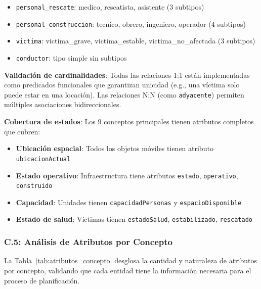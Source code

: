 \documentclass[conference]{IEEEtran}
\begin{document}
    \begin{itemize}[leftmargin=*,itemsep=1pt]
    \item \texttt{personal\_rescate}: medico, rescatista, asistente (3 subtipos)
    \item \texttt{personal\_construccion}: tecnico, obrero, ingeniero, operador (4 subtipos)
    \item \texttt{victima}: victima\_grave, victima\_estable, victima\_no\_afectada (3 subtipos)
    \item \texttt{conductor}: tipo simple sin subtipos
    \end{itemize}

    \textbf{Validación de cardinalidades}: Todas las relaciones 1:1 están implementadas como predicados funcionales que garantizan unicidad (e.g., una víctima solo puede estar en una locación). Las relaciones N:N (como \texttt{adyacente}) permiten múltiples asociaciones bidireccionales.

    \textbf{Cobertura de estados}: Los 9 conceptos principales tienen atributos completos que cubren:
    \begin{itemize}[leftmargin=*,itemsep=1pt]
    \item \textbf{Ubicación espacial}: Todos los objetos móviles tienen atributo \texttt{ubicacionActual}
    \item \textbf{Estado operativo}: Infraestructura tiene atributos \texttt{estado}, \texttt{operativo}, \texttt{construido}
    \item \textbf{Capacidad}: Unidades tienen \texttt{capacidadPersonas} y \texttt{espacioDisponible}
    \item \textbf{Estado de salud}: Víctimas tienen \texttt{estadoSalud}, \texttt{estabilizado}, \texttt{rescatado}
    \end{itemize}

    \subsubsection*{C.5: Análisis de Atributos por Concepto}

    La Tabla~\ref{tab:atributos_concepto} desglosa la cantidad y naturaleza de atributos por concepto, validando que cada entidad tiene la información necesaria para el proceso de planificación.
\end{document}
